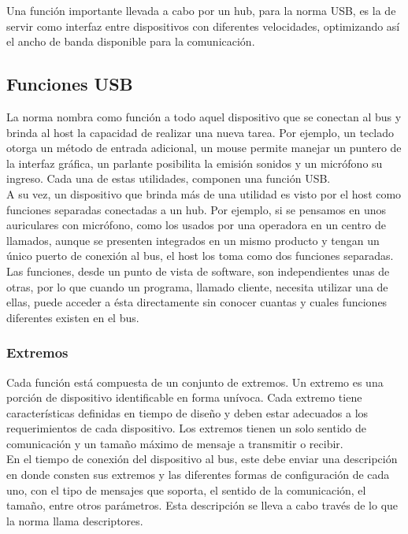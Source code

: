 	Una función importante llevada a cabo por un hub, para la norma USB, es la de servir como interfaz entre dispositivos con diferentes velocidades, optimizando así el ancho de banda disponible para la comunicación.\\
	
\subsection{Funciones USB}
	La norma nombra como función a todo aquel dispositivo que se conectan al bus y brinda al host la capacidad de realizar una nueva tarea. Por ejemplo, un teclado otorga un método de entrada adicional, un mouse permite manejar un puntero de la interfaz gráfica, un parlante posibilita la emisión sonidos y un micrófono su ingreso. Cada una de estas utilidades, componen una función USB.\\
	
	A su vez, un dispositivo que brinda más de una utilidad es visto por el host como funciones separadas conectadas a un hub. Por ejemplo, si se pensamos en unos auriculares con micrófono, como los usados por una operadora en un centro de llamados, aunque se presenten integrados en un mismo producto y tengan un único puerto de conexión al bus, el host los toma como dos funciones separadas.\\
	
	Las funciones, desde un punto de vista de software, son independientes unas de otras, por lo que cuando un programa, llamado cliente, necesita utilizar una de ellas, puede acceder a ésta directamente sin conocer cuantas y cuales funciones diferentes existen en el bus.\\
	
	\subsubsection{Extremos}
	Cada función está compuesta de un conjunto de extremos. Un extremo es una porción de dispositivo identificable en forma unívoca\cite{USBspec}. Cada extremo tiene características definidas en tiempo de diseño y deben estar adecuados a los requerimientos de cada dispositivo. Los extremos tienen un solo sentido de comunicación y un tamaño máximo de mensaje a transmitir o recibir.\\
	
	En el tiempo de conexión del dispositivo al bus, este debe enviar una descripción en donde consten sus extremos y las diferentes formas de configuración de cada uno, con el tipo de mensajes que soporta, el sentido de la comunicación, el tamaño, entre otros parámetros. Esta descripción se lleva a cabo través de lo que la norma llama descriptores.\\
	
